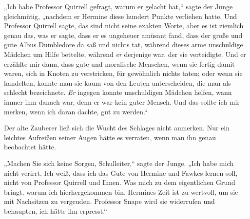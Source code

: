 „Ich habe Professor Quirrell gefragt, warum er gelacht hat,“ sagte der Junge gleichmütig, „nachdem er Hermine diese hundert Punkte verliehen hatte. Und Professor Quirrell sagte, das sind nicht seine exakten Worte, aber es ist ziemlich genau das, was er sagte, dass er es ungeheuer amüsant fand, dass der große und gute Albus Dumbledore da saß und nichts tat, während dieses arme unschuldige Mädchen um Hilfe bettelte, während \emph{er} derjenige war, der sie verteidigte. Und er erzählte mir dann, dass gute und moralische Menschen, wenn sie fertig damit waren, sich in Knoten zu verstricken, für gewöhnlich nichts taten; oder wenn sie handelten, konnte man sie kaum von den Leuten unterscheiden, die man als schlecht bezeichnete. \emph{Er} ingegen konnte unschuldigen Mädchen helfen, wann immer ihm danach war, denn er war kein guter Mensch. Und das sollte ich mir merken, wenn ich daran dachte, gut zu werden.“

Der alte Zauberer ließ sich die Wucht des Schlages nicht anmerken. Nur ein leichtes Aufreißen seiner Augen hätte es verraten, wenn man ihn genau beobachtet hätte.

„Machen Sie sich keine Sorgen, Schulleiter,“ sagte der Junge. „Ich habe mich nicht verirrt. Ich weiß, dass ich das Gute von Hermine und Fawkes lernen soll, nicht von Professor Quirrell und Ihnen. Was mich zu dem eigentlichen Grund bringt, warum ich hierhergekommen bin. Hermines Zeit ist zu wertvoll, um sie mit Nachsitzen zu vergeuden. Professor Snape wird sie widerrufen und behaupten, ich hätte ihn erpresst.“

